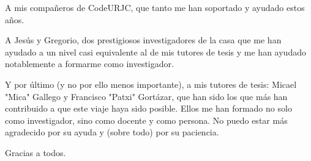 A mis compañeros de CodeURJC, que tanto me han soportado y ayudado estos años.

A Jesús y Gregorio, dos prestigiosos investigadores de la casa que me han ayudado a un nivel casi equivalente al de mis tutores de tesis y me han ayudado notablemente a formarme como investigador.

Y por último (y no por ello menos importante), a mis tutores de tesis: Micael "Mica" Gallego y Francisco "Patxi" Gortázar, que han sido los que más han contribuido a que este viaje haya sido posible. Ellos me han formado no solo como investigador, sino como docente y como persona. No puedo estar más agradecido por su ayuda y (sobre todo) por su paciencia.

Gracias a todos.